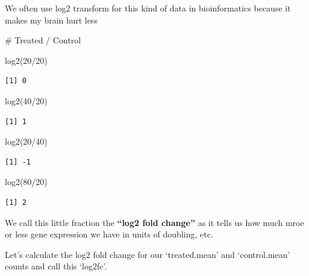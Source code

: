 \documentclass[
  letterpaper,
  DIV=11,
  numbers=noendperiod]{scrartcl}
\newenvironment{Shaded}{\begin{snugshade}}{\end{snugshade}}
\newcommand{\CommentTok}[1]{\textcolor[rgb]{0.37,0.37,0.37}{#1}}
\newcommand{\DecValTok}[1]{\textcolor[rgb]{0.68,0.00,0.00}{#1}}
\newcommand{\FunctionTok}[1]{\textcolor[rgb]{0.28,0.35,0.67}{#1}}
\newcommand{\NormalTok}[1]{\textcolor[rgb]{0.00,0.23,0.31}{#1}}
\newcommand{\SpecialCharTok}[1]{\textcolor[rgb]{0.37,0.37,0.37}{#1}}
\begin{document}
We often use log2 transform for this kind of data in bioinformatics
because it makes my brain hurt less

\begin{Shaded}
\begin{Highlighting}[]
\CommentTok{\# Treated / Control}

\FunctionTok{log2}\NormalTok{(}\DecValTok{20}\SpecialCharTok{/}\DecValTok{20}\NormalTok{)}
\end{Highlighting}
\end{Shaded}

\begin{verbatim}
[1] 0
\end{verbatim}

\begin{Shaded}
\begin{Highlighting}[]
\FunctionTok{log2}\NormalTok{(}\DecValTok{40}\SpecialCharTok{/}\DecValTok{20}\NormalTok{)}
\end{Highlighting}
\end{Shaded}

\begin{verbatim}
[1] 1
\end{verbatim}

\begin{Shaded}
\begin{Highlighting}[]
\FunctionTok{log2}\NormalTok{(}\DecValTok{20}\SpecialCharTok{/}\DecValTok{40}\NormalTok{)}
\end{Highlighting}
\end{Shaded}

\begin{verbatim}
[1] -1
\end{verbatim}

\begin{Shaded}
\begin{Highlighting}[]
\FunctionTok{log2}\NormalTok{(}\DecValTok{80}\SpecialCharTok{/}\DecValTok{20}\NormalTok{)}
\end{Highlighting}
\end{Shaded}

\begin{verbatim}
[1] 2
\end{verbatim}

We call this little fraction the \textbf{``log2 fold change''} as it
tells us how much mroe or less gene expression we have in units of
doubling, etc.

Let's calculate the log2 fold change for our `treated.mean' and
`control.mean' counts and call this `log2fc'.
\end{document}
